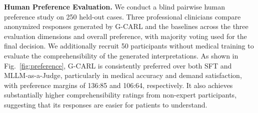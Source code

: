 \documentclass[letterpaper]{article} %
\begin{document}

\noindent \textbf{Human Preference Evaluation.}
We conduct a blind pairwise human preference study on 250 held-out cases. Three professional clinicians compare anonymized responses generated by G-CARL and the baselines across the three evaluation dimensions and overall preference, with majority voting used for the final decision. We additionally recruit 50 participants without medical training to evaluate the comprehensibility of the generated interpretations.
As shown in Fig.~\ref{fig:preference}, G-CARL is consistently preferred over both SFT and MLLM-as-a-Judge, particularly in medical accuracy and demand satisfaction, with preference margins of 136:85 and 106:64, respectively. It also achieves substantially higher comprehensibility ratings from non-expert participants, suggesting that its responses are easier for patients to understand.



\end{document}

